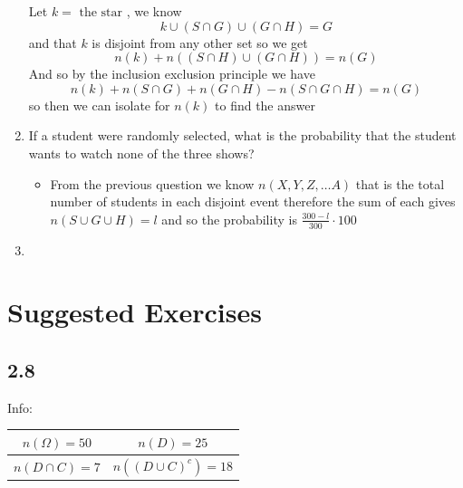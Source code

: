 \documentclass[11pt]{book}
\begin{document}
\begin{enumerate}[label=\alph*)]
\begin{center}
        \end{center}
        Let $k = \text{ the star } $,  we know 
        \[
            k\cup \left( S\cap G \right) \cup \left( G\cap H \right) = G
        \]
        and that $k$ is disjoint from any other set so we get 
        \[
            n\left(k\right)  + n\left(\left( S\cap H \right) \cup \left( G\cap H \right) \right) = n\left(G\right) 
        \]
        And so by the inclusion exclusion principle we have
        \[
        n\left(k\right)  + n\left(S\cap G\right)  + n\left(G\cap H\right)  - n\left(S\cap G\cap H\right) = n\left(G\right) 
        \]
        so then we can isolate for $n\left(k\right) $ to find the answer  
    \item If a student were randomly selected, what is the probability that the student wants to watch none of the three shows?
        \begin{itemize}
            \item From the previous question we know $n\left(X, Y, Z, \ldots A \right) $ that is the total number of students in each disjoint event therefore the sum of each gives $n\left(S\cup G\cup H\right) = l$  and so the probability is $\frac{300 - l}{300} \cdot  100$ 
        \end{itemize}  
    \item {} 
\end{enumerate}




\section{Suggested Exercises}%
\label{sec:suggested_exercises}

\subsection{2.8}%
\label{sub:2_8}

Info:
\begin{tabular}{|c|c|}
\hline
    $n\left(\Omega \right) = 50$  & $n\left(D\right) = 25$  \\
\hline
$n\left(D\cap C\right) = 7$  & $n\left(\left( D\cup C \right) ^{c} \right) = 18 $  \\
\hline
\end{tabular}
\end{document}
